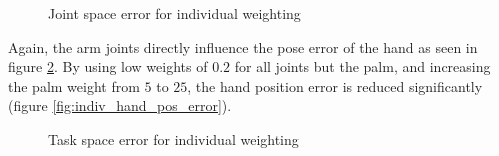\begin{figure}
\centering
{}
%

\caption{Joint space error for individual weighting}
\label{fig:indiv_joint_error}
\end{figure}

Again, the arm joints directly influence the pose error of the hand as seen in figure \ref{fig:indiv_pose_error}. By using low weights of $0.2$ for all joints but the palm, and increasing the palm weight from $5$ to $25$, the hand position error is reduced significantly (figure \ref{fig:indiv_hand_pos_error}).

\begin{figure}
\centering
{}
%

\caption{Task space error for individual weighting}
\label{fig:indiv_pose_error}
\end{figure}

